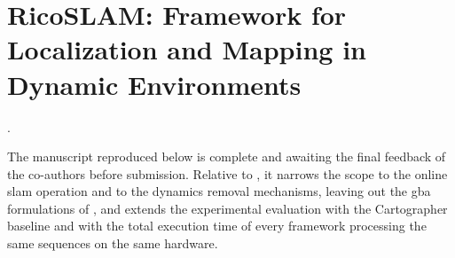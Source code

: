 \chapter[RicoSLAM: Framework for Localization and Mapping in Dynamic
Environments]{RicoSLAM: Framework for Localization and Mapping in
Dynamic Environments}\label{appx:ricoslam}
\begin{description}[leftmargin=1cm,style=nextline,font=\normalfont]
\item[\cite{sousa:ral:2026}] .
\end{description}

\noindent
The manuscript reproduced below is complete and awaiting the final feedback of
the co-authors before submission. Relative to , it narrows
the scope to the online \gls{slam} operation and to the dynamics removal
mechanisms, leaving out the \gls{gba} formulations of ,
and extends the experimental evaluation with the
Cartographer~\cite{hess:icra:2016} baseline and with the total execution time
of every framework processing the same sequences on the same hardware.

\cleardoublepage


